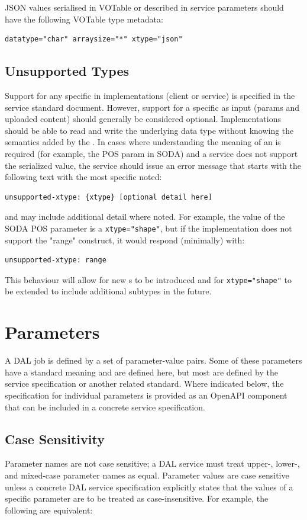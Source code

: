 \documentclass[11pt,letter]{ivoa}
\begin{document}
JSON values serialised in VOTable or described in service parameters should have
the following VOTable type metadata:

\begin{verbatim}
datatype="char" arraysize="*" xtype="json"
\end{verbatim}

\subsection{Unsupported Types}

Support for any specific  in implementations (client or service) is specified in
the service standard document. However, support for a specific  as input (params
and uploaded content) should generally be considered optional. Implementations should
be able to read and write the underlying data type without knowing the semantics added
by the . In cases where understanding the meaning of an  is required (for
example, the POS param in SODA) and a service does not support the serialized value,
the service should issue an error message that starts with the following text with the
most specific  noted:
\begin{verbatim}
unsupported-xtype: {xtype} [optional detail here]
\end{verbatim}
and may include additional detail where noted. For example, the value of the SODA POS parameter
is a \verb|xtype="shape"|, but if the implementation does not support the "range" construct, it
would respond (minimally) with:
\begin{verbatim}
unsupported-xtype: range
\end{verbatim}
This behaviour will allow for new s to be introduced and for \verb|xtype="shape"|
to be extended to include additional subtypes in the future.

\section{Parameters}
\label{sec:parameters}
A DAL job is defined by a set of parameter-value pairs. Some of these parameters
have a standard meaning and are defined here, but most are defined by the
service specification or another related standard. Where indicated below, the
specification for individual parameters is provided as an OpenAPI component that
can be included in a concrete service specification.

\subsection{Case Sensitivity}
Parameter names are not case sensitive; a DAL service must treat
\hbox{upper-,} \hbox{lower-,}
and mixed-case parameter names as equal. Parameter values are case sensitive
unless a concrete DAL service specification explicitly states that the values of
a specific parameter are to be treated as case-insensitive. For example, the
following are equivalent:
\end{document}
